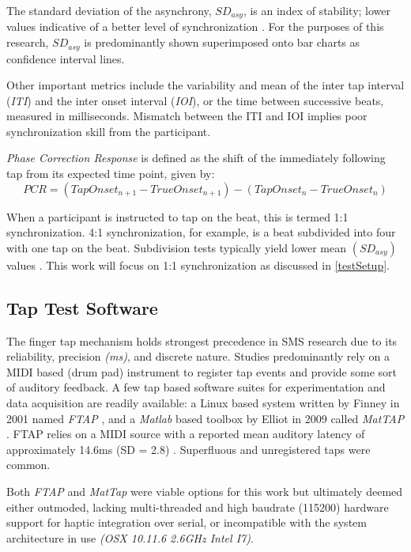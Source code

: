 The standard deviation of the asynchrony, $SD_{asy}$, is an index of stability; lower values indicative of a better level of synchronization \cite{repp2013sensorimotor}. For the purposes of this research, $SD_{asy}$ is predominantly shown superimposed onto bar charts as confidence interval lines.

Other important metrics include the variability and mean of the inter tap interval (\textit{ITI}) and the inter onset interval (\textit{IOI}), or the time between successive beats, measured in milliseconds. Mismatch between the ITI and IOI implies poor synchronization skill from the participant. 

\textit{Phase Correction Response} is defined as the shift of the immediately following tap from its expected time point, given by:
\begin{equation*}
    PCR = (Tap Onset_{n+1} - True Onset_{n+1})-(Tap Onset_{n} - True Onset_{n})
\end{equation*}

When a participant is instructed to tap on the beat, this is termed 1:1 synchronization. 4:1 synchronization, for example, is a beat subdivided into four with one tap on the beat. Subdivision tests typically yield lower mean $(SD_{asy})$ values \cite{repp2013sensorimotor}. This work will focus on 1:1 synchronization as discussed in \ref{testSetup}.

\subsection{Tap Test Software} \label{ttsw}
The finger tap mechanism holds strongest precedence in SMS research due to its reliability, precision \textit{(ms)}, and discrete nature. Studies predominantly rely on a MIDI based (drum pad) instrument to register tap events and provide some sort of auditory feedback. A few tap based software suites for experimentation and data acquisition are readily available: a Linux based system written by Finney in 2001 named \textit{FTAP} \cite{finney2001ftap}, and a \textit{Matlab} based toolbox by Elliot in 2009 called \textit{MatTAP} \cite{elliott2009mattap}. FTAP relies on a MIDI source with a reported mean auditory latency of approximately 14.6ms (SD = 2.8) \cite{schultz2016tap}. Superfluous and unregistered taps were common.

Both \textit{FTAP} and \textit{MatTap} were viable options for this work but ultimately deemed either outmoded, lacking multi-threaded and high baudrate (115200) hardware support for haptic integration over serial, or incompatible with the system architecture in use \textit{(OSX 10.11.6 2.6GHz Intel I7)}.

